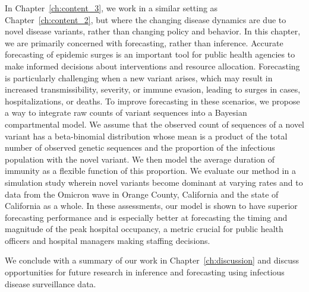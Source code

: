 In Chapter~\ref{ch:content_3}, we work in a similar setting as Chapter~\ref{ch:content_2}, but where the changing disease dynamics are due to novel disease variants, rather than changing policy and behavior.
In this chapter, we are primarily concerned with forecasting, rather than inference.
Accurate forecasting of epidemic surges is an important tool for public health agencies to make informed decisions about interventions and resource allocation.
Forecasting is particularly challenging when a new variant arises, which may result in increased transmissibility, severity, or immune evasion, leading to surges in cases, hospitalizations, or deaths.
To improve forecasting in these scenarios, we propose a way to integrate raw counts of variant sequences into a Bayesian compartmental model.
We assume that the observed count of sequences of a novel variant has a beta-binomial distribution whose mean is a product of the total number of observed genetic sequences and the proportion of the infectious population with the novel variant.
We then model the average duration of immunity as a flexible function of this proportion.
We evaluate our method in a simulation study wherein novel variants become dominant at varying rates and to data from the Omicron wave in Orange County, California and the state of California as a whole.
In these assessments, our model is shown to have superior forecasting performance and is especially better at forecasting the timing and magnitude of the peak hospital occupancy, a metric crucial for public health officers and hospital managers making staffing decisions.

We conclude with a summary of our work in Chapter~\ref{ch:discussion} and discuss opportunities for future research in inference and forecasting using infectious disease surveillance data.

\label{ch_1:sec:thesis_contributions}




